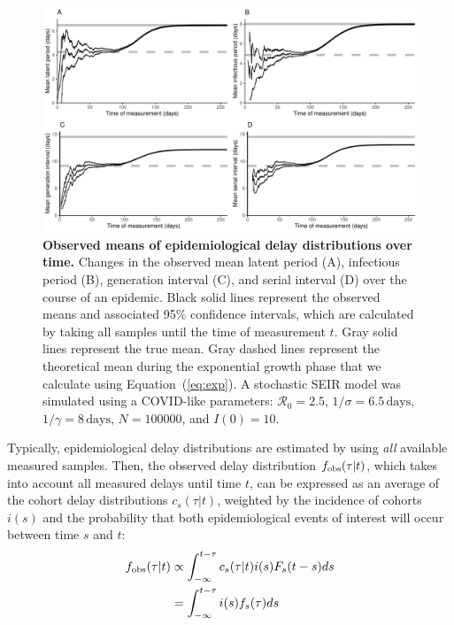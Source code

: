 \documentclass[12pt]{article}
\newcommand{\eref}[1]{(\ref{eq:#1})}
\begin{document}
\begin{figure}[!th]
\includegraphics[width=\textwidth]{figure_seir.pdf}
\caption{
\textbf{Observed means of epidemiological delay distributions over time.}
Changes in the observed mean latent period (A), infectious period (B), generation interval (C), and serial interval (D) over the course of an epidemic.
Black solid lines represent the observed means and associated 95\% confidence intervals, which are calculated by taking all samples until the time of measurement $t$.
Gray solid lines represent the true mean.
Gray dashed lines represent the theoretical mean during the exponential growth phase that we calculate using Equation~\eref{exp}.
A stochastic SEIR model was simulated using a COVID-like parameters: $\mathcal R_0 = 2.5$, $1/\sigma = 6.5\,\textrm{days}$, $1/\gamma = 8\,\textrm{days}$, $N=100000$, and $I(0)=10$.
}
\label{fig:seir}
\end{figure}

Typically, epidemiological delay distributions are estimated by using \emph{all} available measured samples.
Then, the observed delay distribution $f_{\tiny\textrm{obs}}(\tau|t)$, which takes into account all measured delays until time $t$, can be expressed as an average of the cohort delay distributions $c_s(\tau|t)$, weighted by the incidence of cohorts $i(s)$ and the probability that both epidemiological events of interest will occur between time $s$ and $t$:
\begin{equation}
\begin{aligned}
f_{\tiny\textrm{obs}}(\tau|t) &\propto \int_{-\infty}^{t-\tau} c_s(\tau|t) i(s) F_s(t-s) ds\\
&= \int_{-\infty}^{t-\tau} i(s) f_s(\tau) ds
\end{aligned}
\end{equation}
\end{document}
